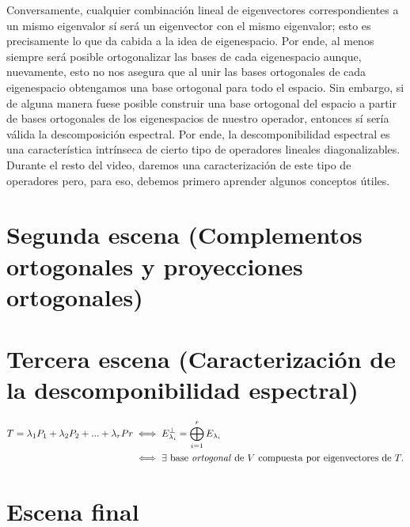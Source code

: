 \documentclass[12pt,dvipsnames]{article}
\numberwithin{equation}{section}
\begin{document}
Conversamente, cualquier combinación lineal de eigenvectores correspondientes a un mismo eigenvalor sí será un eigenvector con el mismo eigenvalor; esto es precisamente lo que da cabida a la idea de eigenespacio. Por ende, al menos siempre será posible ortogonalizar las bases de cada eigenespacio aunque, nuevamente, esto no nos asegura que al unir las bases ortogonales de cada eigenespacio obtengamos una base ortogonal para todo el espacio. Sin embargo, si de alguna manera fuese posible construir una base ortogonal del espacio a partir de bases ortogonales de los eigenespacios de nuestro operador, entonces sí sería válida la descomposición espectral. Por ende, la descomponibilidad espectral es una característica intrínseca de cierto tipo de operadores lineales diagonalizables. Durante el resto del video, daremos una caracterización de este tipo de operadores pero, para eso, debemos primero aprender algunos conceptos útiles.


\newpage
\section{Segunda escena (Complementos ortogonales y proyecciones ortogonales)}




\newpage
\section{Tercera escena (Caracterización de la descomponibilidad espectral)}

\begin{align*}
    T = \lambda_1P_1 + \lambda_2P_2 + ... + \lambda_rPr &\iff E_{\lambda_i}^\perp = \bigoplus_{i=1}^r E_{\lambda_i} \\
                                                        &\iff \exists \text{ base \emph{ortogonal} de } V \text{ compuesta por eigenvectores de } T.
\end{align*}


\newpage
\section{Escena final}
\end{document}
